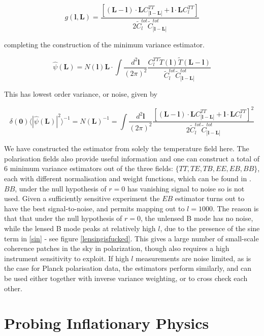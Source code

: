 \documentclass[a4paper,10pt]{article}
\renewcommand{\v}[1]{\mathbf{#1}}
\newcommand{\finttwo}[1]{\int \frac{d^2 \v{#1}}{(2\pi)^2}}
\begin{document}
\begin{equation}
g(\v{l},\v{L}) = \frac{[(\v{L}-\v{l})\cdot\v{L}C^{TT}_{|\v{l}-\v{L}|}+\v{l}\cdot\v{L}C_l^{TT}]}{2\tilde{C}_l^{tot}\tilde{C}_{|\v{l}-\v{L}|}^{tot}}
\end{equation}

completing the construction of the minimum variance estimator. 

\begin{equation}
\hat{\psi}(\v{L}) = N(\v{l})\v{L}\cdot\finttwo{l} \frac{C_l^{TT}\tilde{T}(\v{l})\tilde{T}(\v{L-l})}{\tilde{C}_l^{tot}\tilde{C}_{|\v{l}-\v{L}|}^{tot}}
\end{equation}


This has lowest order variance, or noise, given by


\begin{equation}
\delta(\v{0}) \langle |\hat{\psi}(\v{L})|^2 \rangle^{-1} =  N(\v{L})^{-1} = \finttwo{l}  \frac{[(\v{L}-\v{l})\cdot\v{L}C^{TT}_{|\v{l}-\v{L}|}+\v{l}\cdot\v{L}C_l^{TT}]^2}{2\tilde{C}_l^{tot}\tilde{C}_{|\v{l}-\v{L}|}^{tot}}
\end{equation}

We have constructed the estimator from solely the temperature field here. The polarisation fields also provide useful information and one can construct a total of 6 minimum variance estimators out of the three fields: $\{TT, TE, TB, EE, EB, BB\}$, each with different normalisation and weight functions, which can be found in \cite{hu-estimator}. $BB$, under the null hypothesis of $r=0$ has vanishing signal to noise so is not used. Given a sufficiently sensitive experiment the $EB$ estimator turns out to have the best signal-to-noise, and permits mapping out to $l=1000$. The reason is that that under the null hypothesis of $r=0$, the unlensed B mode has no noise, while the lensed B mode peaks at relatively high $l$, due to the presence of the sine term in \ref{sin} - see figure \ref{lensingisfucked}. This gives a large number of small-scale coherence patches in the sky in polarization, though also requires a high instrument sensitivity to exploit. If high $l$ measurements are noise limited, as is the case for Planck polarisation data, the estimators perform similarly, and can be used either together with inverse variance weighting, or to cross check each other.


\newpage
\section{Probing Inflationary Physics}
\label{probe}
\end{document}
